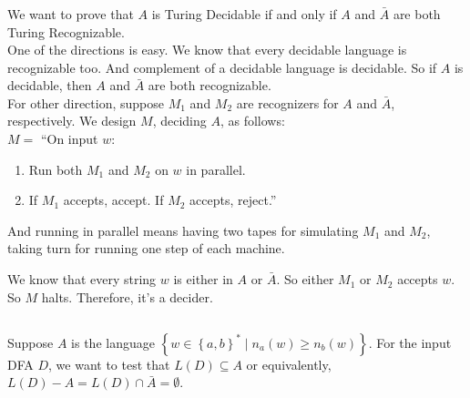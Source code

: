 \documentclass{article}
\begin{document}
\subsubsection{}
We want to prove that \(A\) is Turing Decidable if and only if \(A\) and \(\bar{A}\) are both Turing Recognizable.\\
One of the directions is easy. We know that every decidable language is recognizable too. And complement of a decidable language is decidable. So if \(A\) is decidable, then \(A\) and \(\bar{A}\) are both recognizable.\\
For other direction, suppose \(M_1\) and \(M_2\) are recognizers for \(A\) and \(\bar{A}\), respectively. We design \(M\), deciding \(A\), as follows:\\
\(M = \) ``On input \(w\):
\begin{enumerate}
\item Run both \(M_1\) and \(M_2\) on \(w\) in parallel.
\item If \(M_1\) accepts, accept. If \(M_2\) accepts, reject.''
\end{enumerate}
And running in parallel means having two tapes for simulating \(M_1\) and \(M_2\), taking turn for running one step of each machine.

We know that every string \(w\) is either in \(A\) or \(\bar{A}\). So either \(M_1\) or \(M_2\) accepts \(w\). So \(M\) halts. Therefore, it's a decider.

\subsection{}
\subsubsection{}
Suppose \(A\) is the language \(\left\{w\in \left\{a, b\right\}^*\mid n_a(w) \ge n_b(w)\right\}\).
For the input DFA \(D\), we want to test that \(L(D) \subseteq A\) or equivalently, \(L(D)-A = L(D)\cap \bar{A} = \emptyset\).
\end{document}
